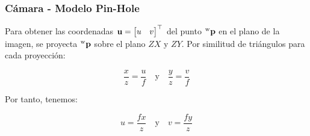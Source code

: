 \begin{frame}
    \frametitle{Cámara - Modelo Pin-Hole}   
    \footnotesize
    \begin{figure}[!h]
        \centering
    \end{figure}

    Para obtener las coordenadas  $\boldsymbol{\mathbf{u}}=\begin{bmatrix}u & v\end{bmatrix}^{\top}$ del punto $\prescript{\mathrm{\mathrm{w}}}{}{\boldsymbol{\mathbf{p}}}$ en el plano de la imagen, se proyecta $\prescript{\mathrm{\mathrm{w}}}{}{\boldsymbol{\mathbf{p}}}$ sobre el plano $ZX$ y $ZY$. Por similitud de triángulos para cada proyección:
    
    \begin{equation*}
        \dfrac{x}{z} = \dfrac{u}{f} \quad \text{y} \quad \dfrac{y}{z} = \dfrac{v}{f}
    \end{equation*}

    Por tanto, tenemos:
    
    \begin{equation*}
        u=\dfrac{fx}{z} \quad \text{y} \quad v=\dfrac{fy}{z}
    \end{equation*}
\end{frame}

